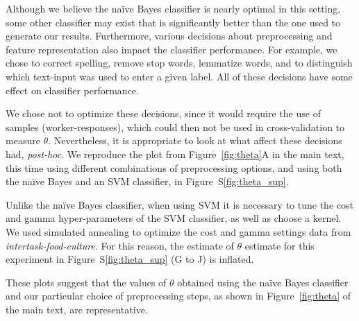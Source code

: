 \documentclass{sigchi}
\begin{document}
Although we believe the na\"ive Bayes classifier is nearly optimal in this
setting, some other classifier may exist that is significantly better than 
the one used to generate our results.  Furthermore, various decisions about
preprocessing and feature representation also
impact the classifier performance.  
For example, we chose to correct spelling, remove stop words,
lemmatize words, and to distinguish which text-input was used to enter a 
given label.  All of these decisions have some effect on classifier 
performance.

We chose not to optimize these decisions, since it would require the
use of samples (worker-responses), which could then not be used in 
cross-validation to measure $\theta$.  Nevertheless, it is
appropriate to look at what affect these decisions had, \textit{post-hoc}.  
We reproduce the plot from Figure~\ref{fig:theta}A in the main text, 
this time using different combinations of preprocessing options,
and using both the na\"ive Bayes and an SVM classifier, in 
Figure~S\ref{fig:theta_sup}.

Unlike the na\"ive Bayes classifier, when using SVM it is necessary to tune 
the cost and gamma hyper-parameters of the SVM classifier, as well as choose 
a kernel.  We used simulated annealing to optimize the cost and gamma settings
data from \textit{intertask-food-culture}.  For this reason, the estimate
of $\theta$ estimate for this experiment in 
Figure~S\ref{fig:theta_sup} (G to J) is inflated. 

These plots suggest that the values of $\theta$ obtained using the 
na\"ive Bayes classifier and our particular choice of preprocessing steps, 
as shown in Figure~\ref{fig:theta} of the main text, are representative.
\end{document}
